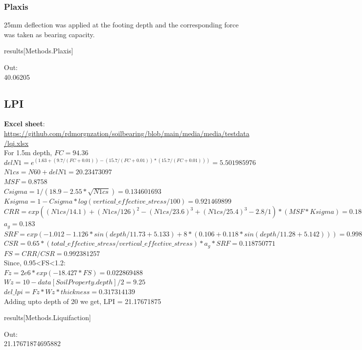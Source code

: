 \subsubsection{Plaxis}
25mm deflection was applied at the footing depth and the corresponding force was taken as bearing capacity.
\begin{python}
results[Methods.Plaxis]
\end{python}
Out:\\
40.06205

\subsection{LPI}
\textbf{Excel sheet}: \url{https://github.com/rdmorgnzation/soilbearing/blob/main/media/media/testdata/lqi.xlsx}
\\
For 1.5m depth,
$FC=94.36$\\
$delN1 = e^(1.63+(9.7/(FC+0.01))-(15.7/(FC+0.01))*(15.7/(FC+0.01)))=5.501985976$\\
$N1cs = N60+delN1 = 20.23473097$\\
$MSF = 0.8758$\\
$Csigma = 1/(18.9-2.55*\sqrt{N1cs}) = 0.134601693$\\
$Ksigma = 1-Csigma*log(vertical\_effective\_stress/100)= 0.921469899$\\
$CRR = exp((N1cs/14.1)+(N1cs/126)^2-(N1cs/23.6)^3+(N1cs/25.4)^3-2.8/1)*(MSF*Ksigma)=0.186699144$\\
$a_g = 0.183$\\
$SRF = exp(-1.012-1.126*sin(depth/11.73+5.133)+8*(0.106+0.118*sin(depth/11.28+5.142)))=0.998325105$\\
$CSR = 0.65*(total\_effective\_stress/vertical\_effective\_stress)*a_g*SRF = 0.118750771$\\
$FS = CRR / CSR = 0.992381257$\\
Since, 0.95<FS<1.2:\\
$Fz = 2e6*exp(-18.427*FS) = 0.022869488$\\
$Wz = 10 - data[SoilProperty.depth]/2 = 9.25$\\
$del\_lpi = Fz * Wz * thickness = 0.317314139$\\
Adding upto depth of 20 we get, LPI = 21.17671875
\begin{python}
results[Methods.Liquifaction]
\end{python}
Out:\\
21.17671874695882
